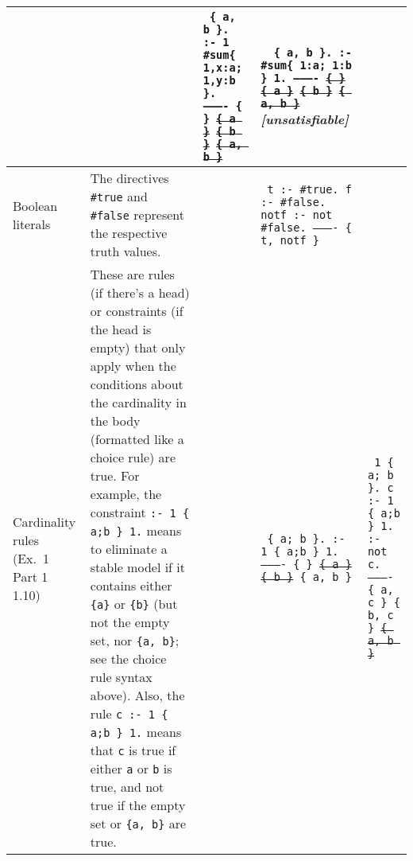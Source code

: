 \documentclass[9pt,a4paper,landscape]{article}
\begin{document}
{\begin{longtable}{Lp{14.5cm}lXX}
&&\texttt{%
	{\footnotesize
		\{ a, b \}. \newline	
		:- 1 \#sum\{ 1,x:a; 1,y:b \}. \newline
		---------- \newline
		\{ \} \newline
		\sout{\{ a \}} \newline
		\sout{\{ b \}} \newline
		\sout{\{ a, b \}} }}
& \texttt{%
	{\footnotesize
		\{ a, b \}. \newline	
		:- \#sum\{ 1:a; 1:b \} 1. \newline
		---------- \newline
		\sout{\{ \}} \newline
		\sout{\{ a \}} \newline
		\sout{\{ b \}} \newline
		\sout{\{ a, b \}} } } \newline
\textit{[unsatisfiable]}\\ \midrule

Boolean literals
& The directives \texttt{\#true} and \texttt{\#false} represent the respective truth values.
&& \texttt{%
	t :- \#true. \newline
	f :- \#false. \newline
	notf :- not \#false. \newline
	---------- \newline				
	\{ t, notf \} } &\\ \midrule

Cardinality rules \newline (Ex.\ 1 Part 1  1.10)
& These are rules (if there's a head) or constraints (if the head is empty) that only apply when the conditions about the cardinality in the body (formatted like a choice rule) are true.
For example, the constraint \texttt{:- 1 \{ a;b \} 1.} means to eliminate a stable model if it contains either \texttt{\{a\}} or \texttt{\{b\}} (but not the empty set, nor \texttt{\{a, b\}}; see the choice rule syntax above).		
Also, the rule \texttt{c :- 1 \{ a;b \} 1.} means that \texttt{c} is true if either \texttt{a} or \texttt{b} is true, and not true if the empty set or \texttt{\{a, b\}} are true.
&& \texttt{%
	\{ a; b \}. \newline
	:- 1 \{ a;b \} 1. \newline
	---------- \newline
	\{ \} \newline
	\sout{\{ a \}} \newline
	\sout{\{ b \}} \newline			
	\{ a, b \}}
& \texttt{%
	1 \{ a; b \}. \newline
	c :- 1 \{ a;b \} 1. \newline
	:- not c. \newline
	---------- \newline
	\{ a, c \} \newline
	\{ b, c \} \newline
	\sout{\{ a, b \}} } \\ \midrule		



\end{longtable}}
\end{document}
